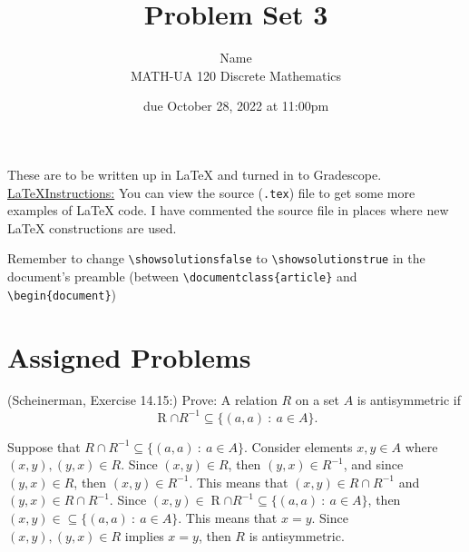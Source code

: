 \documentclass{article}
\title{Problem Set 3}
\author{%
    Name
\\  MATH-UA 120 Discrete Mathematics
}
\date{due October 28, 2022 at 11:00pm}
\newif\ifshowsolutions
\newcommand{\danger}{\marginpar[\hfill\dbend]{\dbend\hfill}}
\theoremstyle{definition}
\begin{document}
\maketitle



These are to be written up in \LaTeX{} and turned in to Gradescope.\\



\ifshowsolutions
    \SetupExSheets{solution/print=true}
\else
    \danger
 \underline{ \LaTeX  Instructions:}  You can view the source (\texttt{.tex}) file to get some more examples of \LaTeX{} code.  I have commented the source file in places where new \LaTeX{} constructions are used.
  
  Remember to change \verb|\showsolutionsfalse| to \verb|\showsolutionstrue|
    in the document's preamble 
    (between \verb|\documentclass{article}| and \verb|\begin{document}|)
\fi

\section*{Assigned Problems}

\begin{question}
    (Scheinerman, Exercise 14.15:)
    Prove: A relation $R$ on a set $A$ is antisymmetric if 
    \[\mathrel{R}\cap R^{-1} \subseteq \{ (a, a) ~:~ a \in A \}. \]
\end{question}
\begin{solution}
Suppose that $R \cap R^{-1} \subseteq \{ (a, a) ~:~ a \in A \}$. Consider elements $x, y\in A$ where $(x, y), (y, x) \in R$. Since $(x, y) \in R$, then $(y, x) \in R^{-1}$, and since $(y, x) \in R$, then $(x, y) \in R^{-1}$. This means that $(x, y) \in R\cap R^{-1}$ and $(y, x) \in R\cap R^{-1}$. Since $(x, y) \in\mathrel{R}\cap R^{-1}\subseteq \{ (a, a) ~:~ a \in A \}$, then $(x, y) \in \subseteq \{ (a, a) ~:~ a \in A \}$.  This means that $x = y$. Since $(x, y), (y, x) \in R$ implies $x= y$, then $R$ is antisymmetric.
\end{solution}
\end{document}
